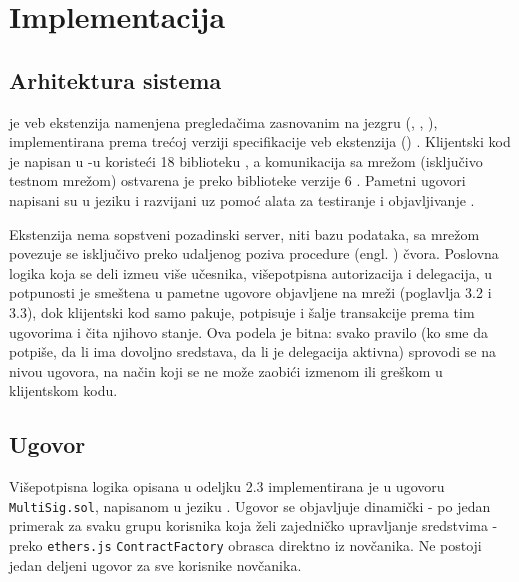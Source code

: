 \chapter{Implementacija}

\section{Arhitektura sistema}

 je veb ekstenzija namenjena pregleda\v cima zasnovanim na  jezgru (, , ), implementirana prema tre\' coj verziji specifikacije veb ekstenzija () \cite{chromemv32023}. Klijentski kod je napisan u -u koriste\' ci  18 biblioteku \cite{react2024}, a komunikacija sa  mre\v zom (isklju\v civo  testnom mre\v zom) ostvarena je preko  biblioteke verzije 6 \cite{ethersjs2024}. Pametni ugovori napisani su u  jeziku \cite{solidity2024} i razvijani uz pomo\' c  alata za testiranje i objavljivanje \cite{foundry2024}.

Ekstenzija nema sopstveni pozadinski server, niti bazu podataka, sa  mre\v zom povezuje se isklju\v civo preko udaljenog poziva procedure (engl. ) \v cvora. Poslovna logika koja se deli izme\dj u vi\v se u\v cesnika, vi\v sepotpisna autorizacija i  delegacija, u potpunosti je sme\v stena u pametne ugovore objavljene na mre\v zi (poglavlja 3.2 i 3.3), dok klijentski kod samo pakuje, potpisuje i \v salje transakcije prema tim ugovorima i \v cita njihovo stanje. Ova podela je bitna: svako pravilo (ko sme da potpi\v se, da li ima dovoljno sredstava, da li je delegacija aktivna) sprovodi se na nivou ugovora, na na\v cin koji se ne mo\v ze zaobi\' ci izmenom ili gre\v skom u klijentskom kodu.

\section{Ugovor }

Vi\v sepotpisna logika opisana u odeljku 2.3 implementirana je u ugovoru \texttt{MultiSig.sol}, napisanom u  jeziku \cite{solidity2024}. Ugovor se objavljuje dinami\v cki - po jedan primerak za svaku grupu korisnika koja \v zeli zajedni\v cko upravljanje sredstvima - preko \texttt{ethers.js} \texttt{ContractFactory} obrasca direktno iz nov\v canika. Ne postoji jedan deljeni  ugovor za sve korisnike  nov\v canika.

